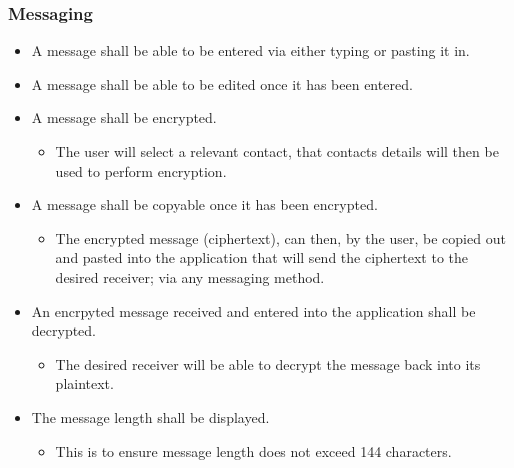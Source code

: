 \subsubsection{Messaging}
\begin{itemize}
\item A message shall be able to be entered via either typing or pasting it in.
\item A message shall be able to be edited once it has been entered.
\item A message shall be encrypted.
\begin{itemize}
\item The user will select a relevant contact, that contacts details will then be used to perform encryption.
\end{itemize}
\item A message shall be copyable once it has been encrypted.
\begin{itemize}
\item The encrypted message (ciphertext), can then, by the user, be copied out and pasted into the application that will send the ciphertext to the desired receiver; via any messaging method.
\end{itemize}
\item An encrpyted message received and entered into the application shall be decrypted.
\begin{itemize}
\item The desired receiver will be able to decrypt the message back into its plaintext.
\end{itemize}
\item The message length shall be displayed.
\begin{itemize}
\item This is to ensure message length does not exceed 144 characters.
\end{itemize}
\end{itemize}

